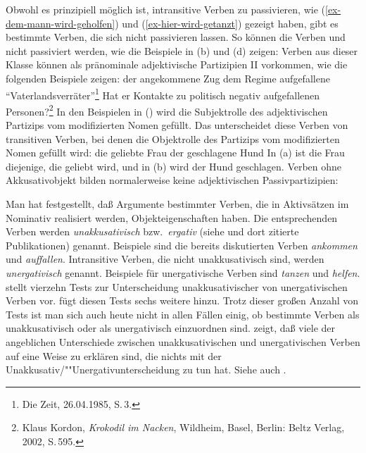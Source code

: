 
Obwohl es prinzipiell möglich ist, intransitive Verben zu passivieren, wie
(\ref{ex-dem-mann-wird-geholfen}) und (\ref{ex-hier-wird-getanzt}) gezeigt haben,
gibt es bestimmte Verben, die sich nicht passivieren lassen.
So können die Verben  und   nicht passiviert werden,
wie die Beispiele in (b) und (d) zeigen:
\eal
\label{ex-passive-erg}
\zl
{}%
Verben aus dieser Klasse können als pränominale adjektivische Partizipien II vorkommen,
wie die folgenden Beispiele zeigen:
\eal
\label{ex-prenominal-erg}
\ex 
der angekommene Zug
\ex
dem Regime aufgefallene "`Vaterlandsverräter"'\footnote{
        Die Zeit, 26.04.1985, S.\,3.%
}
\ex Hat er Kontakte zu politisch negativ aufgefallenen Personen?\footnote{
   Klaus Kordon, \emph{Krokodil im Nacken}, Wildheim, Basel, Berlin: Beltz Verlag, 2002, S.\,595.%
}
\zl
In den Beispielen in () wird die Subjektrolle des adjektivischen Partizips vom
modifizierten Nomen gefüllt. Das unterscheidet diese Verben von transitiven Verben,
bei denen die Objektrolle des Partizips vom modifizierten Nomen gefüllt wird:
\eal
\ex die geliebte Frau
\ex der geschlagene Hund
\zl
In (a) ist die Frau diejenige, die geliebt wird, und in (b)
wird der Hund geschlagen. Verben ohne Akkusativobjekt bilden normalerweise
keine adjektivischen Passivpartizipien:
\eal
\label{ex-prenominal-nerg}
\zl

\noindent
Man hat festgestellt, daß Argumente bestimmter Verben, die in Aktivsätzen im Nominativ realisiert
werden, Objekteigenschaften haben. Die entsprechenden Verben werden \emph{unakkusativisch}
\citep{Perlmutter78} bzw.\ \emph{ergativ} (siehe \zb {} und dort
zitierte Publikationen\nocite{Pullum88a}) genannt. Beispiele sind die bereits diskutierten Verben
\emph{ankommen} und \emph{auffallen}. Intransitive Verben, die nicht unakkusativisch sind, werden
\emph{unergativisch} genannt. Beispiele für unergativische Verben sind
\emph{tanzen} und \emph{helfen}. \citet{Grewendorf89a} stellt
vierzehn Tests zur Unterscheidung unakkusativischer von unergativischen Verben vor.
\citet{Fanselow92} fügt diesen Tests sechs weitere hinzu.  Trotz dieser großen Anzahl
von Tests ist man sich auch heute nicht in allen Fällen einig, ob bestimmte Verben als
unakkusativisch oder als unergativisch einzuordnen sind.
\citet{Kaufmann95a}
zeigt, daß viele der angeblichen Unterschiede zwischen unakkusativischen und unergativischen Verben
auf eine Weise zu erklären sind, die nichts mit der Unakkusativ/""Unergativunterscheidung zu tun
hat. Siehe auch .

